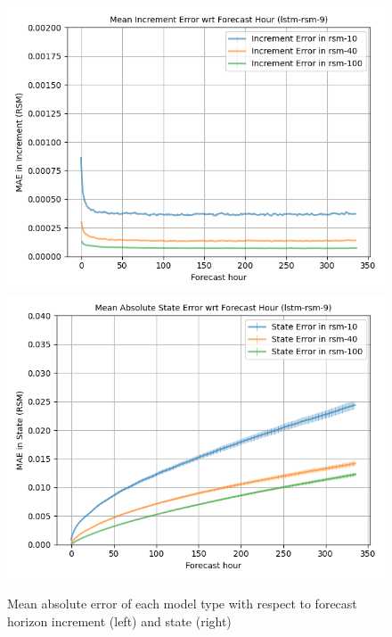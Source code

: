 \begin{figure}[hp!]
    \includegraphics[width=.42\linewidth,draft=false]{figures/horizons/eval_test_lstm-rsm-9_rsm_horizon_na_res.png}
    \includegraphics[width=.42\linewidth,draft=false]{figures/horizons/eval_test_lstm-rsm-9_rsm_horizon_na_state.png}


    \caption{Mean absolute error of each model type with respect to forecast horizon increment (left) and state (right)}
    \label{best-horizons}
\end{figure}


